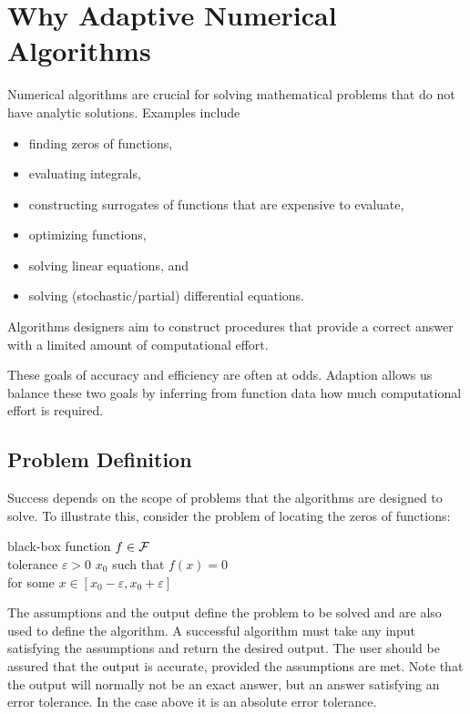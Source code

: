 \chapter{Why Adaptive Numerical Algorithms}
Numerical algorithms are crucial for solving mathematical problems that do not have analytic solutions.  Examples include 
\begin{itemize}
    \item finding zeros of functions,
    \item evaluating integrals,
    \item constructing surrogates of functions that are expensive to evaluate,
    \item optimizing functions,
    \item solving linear equations, and
    \item solving (stochastic/partial) differential equations.
\end{itemize}
Algorithms designers aim to construct procedures that provide a correct answer with a limited amount of computational effort.  

These goals of accuracy and efficiency are often at odds.  Adaption allows us balance these two goals by inferring from function data how much computational effort is required.

\section{Problem Definition}

Success depends on the scope of problems that the algorithms are designed to solve.  To illustrate this, consider the problem of locating the zeros of functions:
\begin{NumProblem} \label{prob:findzero}
%
{black-box function $f \in \mathcal{F}$ \\ tolerance $\varepsilon > 0$ }%
{$x_0$ such that $f(x) = 0$ \\ 
    \qquad for some $x \in [x_0 - \varepsilon, x_0 + \varepsilon]$}
\end{NumProblem}

The assumptions and the output define the problem to be solved and are also used to define the algorithm. A successful algorithm must take any input satisfying the assumptions and return the desired output.   The user should be assured that the output is accurate, provided the assumptions are met.  Note that the output will normally not be an exact answer, but an answer satisfying an error tolerance.  In the case above it is an absolute error tolerance.


